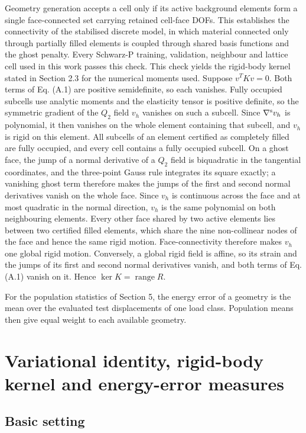 \documentclass[preprint,12pt,authoryear]{elsarticle}
\begin{document}
Geometry generation accepts a cell only if its active background elements form a single face-connected set carrying retained cell-face DOFs. This establishes the connectivity of the stabilised discrete model, in which material connected only through partially filled elements is coupled through shared basis functions and the ghost penalty. Every Schwarz-P training, validation, neighbour and lattice cell used in this work passes this check. This check yields the rigid-body kernel stated in Section 2.3 for the numerical moments used. Suppose \(v^TKv=0\). Both terms of Eq. (A.1) are positive semidefinite, so each vanishes. Fully occupied subcells use analytic moments and the elasticity tensor is positive definite, so the symmetric gradient of the \(Q_2\) field \(v_h\) vanishes on such a subcell. Since \(\nabla^{\rm s}v_h\) is polynomial, it then vanishes on the whole element containing that subcell, and \(v_h\) is rigid on this element. All subcells of an element certified as completely filled are fully occupied, and every cell contains a fully occupied subcell. On a ghost face, the jump of a normal derivative of a \(Q_2\) field is biquadratic in the tangential coordinates, and the three-point Gauss rule integrates its square exactly; a vanishing ghost term therefore makes the jumps of the first and second normal derivatives vanish on the whole face. Since \(v_h\) is continuous across the face and at most quadratic in the normal direction, \(v_h\) is the same polynomial on both neighbouring elements. Every other face shared by two active elements lies between two certified filled elements, which share the nine non-collinear nodes of the face and hence the same rigid motion. Face-connectivity therefore makes \(v_h\) one global rigid motion. Conversely, a global rigid field is affine, so its strain and the jumps of its first and second normal derivatives vanish, and both terms of Eq. (A.1) vanish on it. Hence \(\ker K=\operatorname{range}R\).

For the population statistics of Section 5, the energy error of a geometry is the mean over the evaluated test displacements of one load class. Population means then give equal weight to each available geometry.

\section{Variational identity, rigid-body kernel and energy-error measures}

\subsection{Basic setting}
\end{document}

